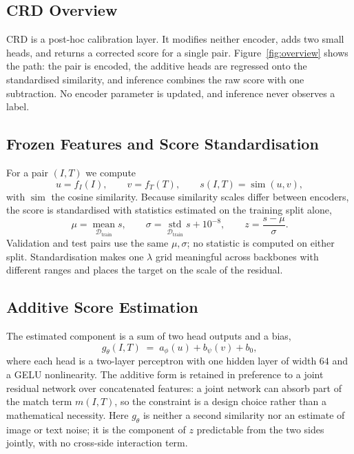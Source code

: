 \subsection{CRD Overview}
\label{sec:method}
CRD is a post-hoc calibration layer. It modifies neither encoder, adds two small
heads, and returns a corrected score for a single pair. Figure~\ref{fig:overview}
shows the path: the pair is encoded, the additive heads are regressed onto the
standardised similarity, and inference combines the raw score with one subtraction.
No encoder parameter is updated, and inference never observes a label.

\subsection{Frozen Features and Score Standardisation}
For a pair $(I,T)$ we compute
\begin{equation}
  u = f_I(I), \qquad v = f_T(T), \qquad s(I,T) = \operatorname{sim}(u,v),
\end{equation}
with $\operatorname{sim}$ the cosine similarity. Because similarity scales differ
between encoders, the score is standardised with statistics estimated on the
training split alone,
\begin{equation}
  \mu = \operatorname*{mean}_{\mathcal{D}_{\text{train}}} s, \qquad
  \sigma = \operatorname*{std}_{\mathcal{D}_{\text{train}}} s + 10^{-8}, \qquad
  z = \frac{s-\mu}{\sigma}.
  \label{eq:z}
\end{equation}
Validation and test pairs use the same $\mu,\sigma$; no statistic is computed on
either split. Standardisation makes one $\lambda$ grid meaningful across backbones
with different ranges and places the target on the scale of the residual.

\subsection{Additive Score Estimation}
The estimated component is a sum of two head outputs and a bias,
\begin{equation}
  g_\theta(I,T) \;=\; a_\phi(u) + b_\psi(v) + b_0,
  \label{eq:g}
\end{equation}
where each head is a two-layer perceptron with one hidden layer of width $64$ and a
GELU nonlinearity. The additive form is retained in preference to a joint residual
network over concatenated features: a joint network can absorb part of the match term
$m(I,T)$, so the constraint is a design choice rather than a mathematical necessity. Here $g_\theta$ is neither a second similarity nor an estimate of image or text
noise; it is the component of $z$ predictable from the two sides jointly, with no
cross-side interaction term.

